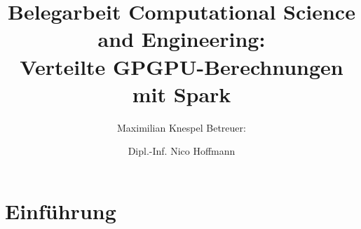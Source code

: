 \title{Belegarbeit Computational Science and Engineering:\\
       Verteilte GPGPU-Berechnungen mit Spark }
\author {
	Maximilian Knespel
	\newline	\newline
	Betreuer: \and Dipl.-Inf. Nico Hoffmann
}
\date{}




\begin{frame}
	\titlepage
\end{frame}



\section{Einführung}


